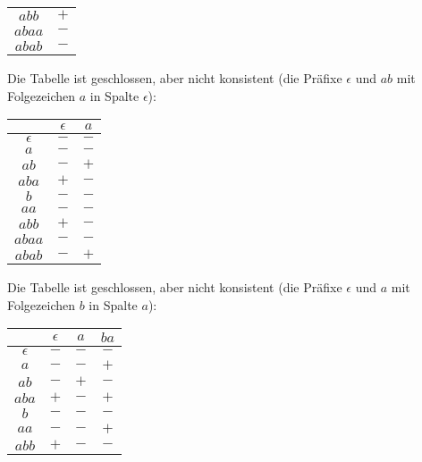 \documentclass[11pt,a4paper]{article}
\begin{document}
{{\begin{loesung}
\begin{enumerate}
\begin{table}[h!]
\begin{tabular}{c|c}
                $abb$ & $+$ \\
                $abaa$ & $-$ \\
                $abab$ & $-$ \\
            \end{tabular}
        \end{table}
        \FloatBarrier
        Die Tabelle ist geschlossen, aber nicht konsistent (die Präfixe $\epsilon$ und $ab$ mit Folgezeichen $a$ in Spalte $\epsilon$):
        \begin{table}[h!]
            \centering
            \begin{tabular}{c|cc}
                & $\epsilon$ & $a$ \\
                \hline
                $\epsilon$ & $-$ & $-$ \\
                $a$ & $-$ & $-$ \\
                $ab$ & $-$ & $+$ \\
                $aba$ & $+$ & $-$ \\
                \hline
                $b$ & $-$ & $-$ \\
                $aa$ & $-$ & $-$ \\
                $abb$ & $+$ & $-$ \\
                $abaa$ & $-$ & $-$ \\
                $abab$ & $-$ & $+$ \\
            \end{tabular}
        \end{table}
        \FloatBarrier
        Die Tabelle ist geschlossen, aber nicht konsistent (die Präfixe $\epsilon$ und $a$ mit Folgezeichen $b$ in Spalte $a$):
        \begin{table}[h!]
            \centering
            \begin{tabular}{c|ccc}
                & $\epsilon$ & $a$ & $ba$ \\
                \hline
                $\epsilon$ & $-$ & $-$ & $-$ \\
                $a$ & $-$ & $-$ & $+$ \\
                $ab$ & $-$ & $+$ & $-$ \\
                $aba$ & $+$ & $-$ & $+$ \\
                \hline
                $b$ & $-$ & $-$ & $-$ \\
                $aa$ & $-$ & $-$ & $+$ \\
                $abb$ & $+$ & $-$ & $-$ \\

\end{tabular}
\end{table}
\end{enumerate}
\end{loesung}}}
\end{document}

